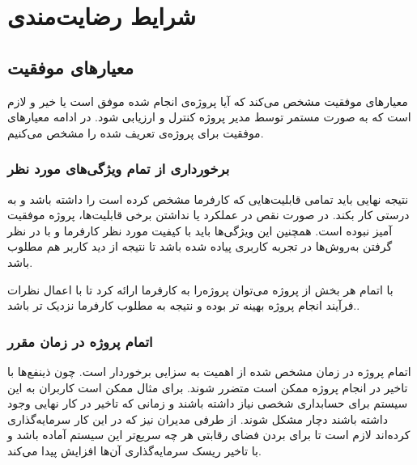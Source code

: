 


\chapter{
	شرایط رضایت‌مندی
}



\section{معیارهای موفقیت}
معیار‌های موفقیت مشخص می‌کند که آیا پروژه‌ی انجام شده موفق است یا خیر و لازم است که به صورت مستمر توسط مدیر پروژه کنترل و ارزیابی شود.
در ادامه معیار‌های موفقیت برای پروژه‌ی تعریف شده را مشخص می‌کنیم.

\subsection{برخورداری از تمام ویژگی‌های مورد نظر}
نتیجه نهایی باید تمامی قابلیت‌هایی که کارفرما مشخص کرده است را داشته باشد و به درستی کار بکند. در صورت نقص در عملکرد یا نداشتن برخی قابلیت‌ها، پروژه موفقیت آمیز نبوده است.
همچنین این ویژگی‌ها باید با کیفیت مورد نظر کارفرما و با در نظر گرفتن به‌روش‌ها در تجربه کاربری پیاده شده باشد تا نتیجه از دید کاربر هم مطلوب باشد.

با اتمام هر بخش از پروژه می‌توان پروژه‌را به کارفرما ارائه کرد تا با اعمال نظرات  فرآیند انجام پروژه بهینه تر بوده و نتیجه به مطلوب کارفرما نزدیک تر باشد..

\subsection{اتمام پروژه در زمان مقرر}
اتمام پروژه در زمان مشخص شده از اهمیت به سزایی برخوردار است. چون ذینفع‌ها با تاخیر در انجام پروژه ممکن است متضرر شوند.
برای مثال ممکن است کاربران به این سیستم برای حسابداری شخصی نیاز داشته باشند و زمانی که تاخیر در کار نهایی وجود داشته باشند دچار مشکل شوند.
از طرفی مدیران نیز که در این کار سرمایه‌گذاری کرده‌اند لازم است تا برای بردن فضای رقابتی هر چه سریع‌تر این سیستم آماده باشد و با تاخیر ریسک سرمایه‌گذاری آن‌ها افزایش پیدا می‌کند.

